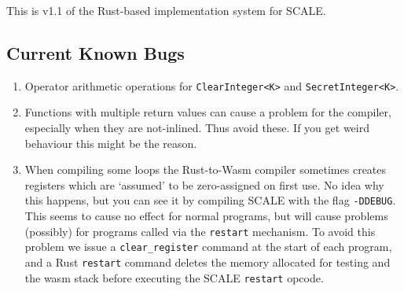 
This is v1.1 of the Rust-based implementation system
for SCALE.

\subsection{Current Known Bugs}
\begin{enumerate}
\item Operator arithmetic operations for  \verb|ClearInteger<K>| and \verb|SecretInteger<K>|.
\item Functions with multiple return values can cause a problem for the compiler, especially
when they are not-inlined. Thus avoid these. If you get weird behaviour this might
be the reason.
\item When compiling some loops the Rust-to-Wasm compiler sometimes creates
	registers which are `assumed' to be zero-assigned on first use.
	No idea why this happens, but you can see it by compiling SCALE with
	the flag \verb|-DDEBUG|. This seems to cause no effect for normal
	programs, but will cause problems (possibly) for programs called
	via the \verb|restart| mechanism. To avoid this problem we issue
	a \verb|clear_register| command at the start of each program,
	and a Rust \verb|restart| command deletes the memory allocated
	for testing and the wasm stack before executing the SCALE
	\verb|restart| opcode.
\end{enumerate}

